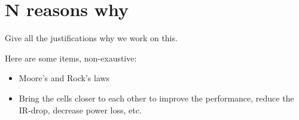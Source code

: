\section{N reasons why}
Give all the justifications why we work on this.

Here are some items, non-exaustive:
\begin{itemize}
\item Moore's and Rock's laws
\item Bring the cells closer to each other to improve the performance, reduce the IR-drop, decrease power loss, etc.
\end{itemize}